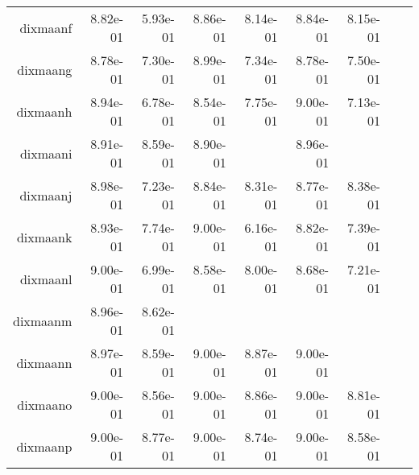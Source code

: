 \begin{tabular}{rrrrrrrrr}
  dixmaanf &  8.82e-01 &  5.93e-01 &  8.86e-01 &  8.14e-01 &  8.84e-01 &  8.15e-01 & \cellcolor{black}{\color{white}{ 8.67e-01}} & \cellcolor{black}{\color{white}{ 7.76e-01}} \\
  dixmaang &  8.78e-01 &  7.30e-01 &  8.99e-01 &  7.34e-01 &  8.78e-01 &  7.50e-01 & \cellcolor{black}{\color{white}{ 8.58e-01}} & \cellcolor{black}{\color{white}{ 7.12e-01}} \\
  dixmaanh &  8.94e-01 &  6.78e-01 &  8.54e-01 &  7.75e-01 &  9.00e-01 &  7.13e-01 & \cellcolor{black}{\color{white}{ 8.95e-01}} & \cellcolor{black}{\color{white}{ 6.69e-01}} \\
  dixmaani &  8.91e-01 &  8.59e-01 &  8.90e-01 & \cellcolor{black}{\color{white}{ 8.60e-01}} &  8.96e-01 & \cellcolor{black}{\color{white}{ 8.66e-01}} & \cellcolor{black}{\color{white}{ 8.95e-01}} & \cellcolor{black}{\color{white}{ 8.89e-01}} \\
  dixmaanj &  8.98e-01 &  7.23e-01 &  8.84e-01 &  8.31e-01 &  8.77e-01 &  8.38e-01 & \cellcolor{black}{\color{white}{ 8.51e-01}} & \cellcolor{black}{\color{white}{ 8.09e-01}} \\
  dixmaank &  8.93e-01 &  7.74e-01 &  9.00e-01 &  6.16e-01 &  8.82e-01 &  7.39e-01 & \cellcolor{black}{\color{white}{ 8.61e-01}} & \cellcolor{black}{\color{white}{ 6.68e-01}} \\
  dixmaanl &  9.00e-01 &  6.99e-01 &  8.58e-01 &  8.00e-01 &  8.68e-01 &  7.21e-01 & \cellcolor{black}{\color{white}{ 8.14e-01}} & \cellcolor{black}{\color{white}{ 6.35e-01}} \\
  dixmaanm &  8.96e-01 &  8.62e-01 & \cellcolor{black}{\color{white}{ 8.96e-01}} & \cellcolor{black}{\color{white}{ 8.65e-01}} & \cellcolor{black}{\color{white}{ 8.99e-01}} & \cellcolor{black}{\color{white}{ 8.82e-01}} & \cellcolor{black}{\color{white}{ 9.00e-01}} & \cellcolor{black}{\color{white}{ 8.76e-01}} \\
  dixmaann &  8.97e-01 &  8.59e-01 &  9.00e-01 &  8.87e-01 &  9.00e-01 & \cellcolor{black}{\color{white}{ 8.68e-01}} & \cellcolor{black}{\color{white}{ 9.00e-01}} & \cellcolor{black}{\color{white}{ 8.49e-01}} \\
  dixmaano &  9.00e-01 &  8.56e-01 &  9.00e-01 &  8.86e-01 &  9.00e-01 &  8.81e-01 & \cellcolor{black}{\color{white}{ 9.00e-01}} & \cellcolor{black}{\color{white}{ 8.71e-01}} \\
  dixmaanp &  9.00e-01 &  8.77e-01 &  9.00e-01 &  8.74e-01 &  9.00e-01 &  8.58e-01 & \cellcolor{black}{\color{white}{ 9.00e-01}} & \cellcolor{black}{\color{white}{ 7.75e-01}} \\

\end{tabular}

